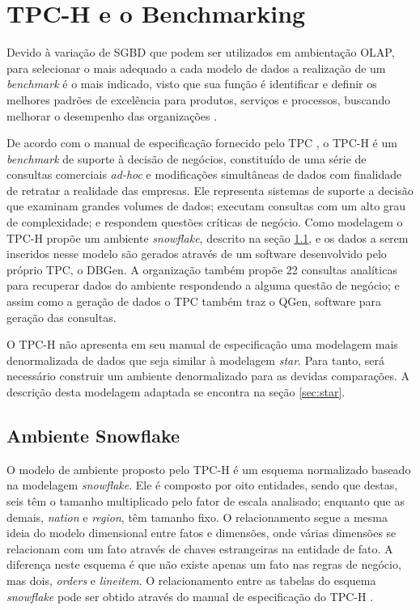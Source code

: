 \documentclass[conference]{IEEEtran}
\begin{document}
\section{TPC-H e o Benchmarking}

Devido à variação de SGBD que podem ser utilizados em ambientação OLAP, para selecionar o mais adequado a cada modelo de dados a realização de um \textit{benchmark} é o mais indicado, visto que sua função é identificar e definir os melhores padrões de excelência para produtos, serviços e processos, buscando melhorar o desempenho das organizações \cite{kyro2003revising,bhutta1999benchmarking}.

De acordo com o manual de especificação fornecido pelo TPC \cite{tpc2017specs}, o TPC-H é um \textit{benchmark} de suporte à decisão de negócios, constituído de uma série de consultas comerciais \textit{ad-hoc} e modificações simultâneas de dados com finalidade de retratar a realidade das empresas. Ele representa sistemas de suporte a decisão que examinam grandes volumes de dados; executam consultas com um alto grau de complexidade; e respondem questões críticas de negócio. Como modelagem o TPC-H propõe um ambiente \textit{snowflake}, descrito na seção \ref{sec:snowflake}, e os dados a serem inseridos nesse modelo são gerados através de um software desenvolvido pelo próprio TPC, o DBGen. A organização também propõe 22 consultas analíticas para recuperar dados do ambiente respondendo a alguma questão de negócio; e assim como a geração de dados o TPC também traz o QGen, software para geração das consultas.

O TPC-H não apresenta em seu manual de especificação uma modelagem mais denormalizada de dados que seja similar à modelagem \textit{star}. Para tanto, será necessário construir um ambiente denormalizado para as devidas comparações. A descrição desta modelagem adaptada se encontra na seção \ref{sec:star}.

\subsection{Ambiente Snowflake}
\label{sec:snowflake}

O modelo de ambiente proposto pelo TPC-H é um esquema normalizado baseado na modelagem \textit{snowflake}. Ele é composto por oito entidades, sendo que destas, seis têm o tamanho multiplicado pelo fator de escala analisado; enquanto que as demais, \textit{nation} e \textit{region}, têm tamanho fixo. O relacionamento segue a mesma ideia do modelo dimensional entre fatos e dimensões, onde várias dimensões se relacionam com um fato através de chaves estrangeiras na entidade de fato. A diferença neste esquema é que não existe apenas um fato nas regras de negócio, mas dois, \textit{orders} e \textit{lineitem}. O relacionamento entre as tabelas do esquema \textit{snowflake} pode ser obtido através do manual de especificação do TPC-H \cite{tpc2017specs}.
\end{document}

